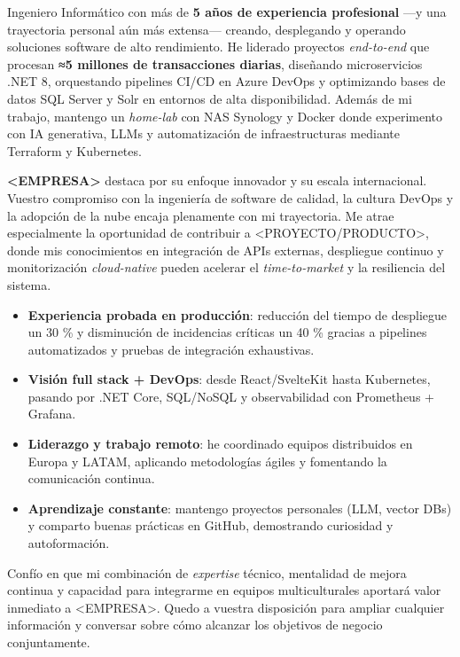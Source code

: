 \documentclass[11pt,a4paper]{awesome-cv}
\begin{document}
\begin{cvletter}

  Ingeniero Informático con más de \textbf{5 años de experiencia profesional} —y una trayectoria personal aún más extensa— creando, desplegando y operando soluciones software de alto rendimiento.  
  He liderado proyectos \textit{end-to-end} que procesan \textbf{≈5 millones de transacciones diarias}, diseñando microservicios .NET 8, orquestando pipelines CI/CD en Azure DevOps y optimizando bases de datos SQL Server y Solr en entornos de alta disponibilidad.  
  Además de mi trabajo, mantengo un \textit{home-lab} con NAS Synology y Docker donde experimento con IA generativa, LLMs y automatización de infraestructuras mediante Terraform y Kubernetes.

  \textbf{<EMPRESA>} destaca por su enfoque innovador y su escala internacional. Vuestro compromiso con la ingeniería de software de calidad, la cultura DevOps y la adopción de la nube encaja plenamente con mi trayectoria.  
  Me atrae especialmente la oportunidad de contribuir a <PROYECTO/PRODUCTO>, donde mis conocimientos en integración de APIs externas, despliegue continuo y monitorización \textit{cloud-native} pueden acelerar el \textit{time-to-market} y la resiliencia del sistema.

  \begin{itemize}
      \item \textbf{Experiencia probada en producción}: reducción del tiempo de despliegue un 30 \% y disminución de incidencias críticas un 40 \% gracias a pipelines automatizados y pruebas de integración exhaustivas.
      \item \textbf{Visión full stack + DevOps}: desde React/SvelteKit hasta Kubernetes, pasando por .NET Core, SQL/NoSQL y observabilidad con Prometheus + Grafana.
      \item \textbf{Liderazgo y trabajo remoto}: he coordinado equipos distribuidos en Europa y LATAM, aplicando metodologías ágiles y fomentando la comunicación continua.
      \item \textbf{Aprendizaje constante}: mantengo proyectos personales (LLM, vector DBs) y comparto buenas prácticas en GitHub, demostrando curiosidad y autoformación.
  \end{itemize}

  Confío en que mi combinación de \textit{expertise} técnico, mentalidad de mejora continua y capacidad para integrarme en equipos multiculturales aportará valor inmediato a <EMPRESA>.  
  Quedo a vuestra disposición para ampliar cualquier información y conversar sobre cómo alcanzar los objetivos de negocio conjuntamente.

\end{cvletter}

\makeletterclosing
\end{document}
